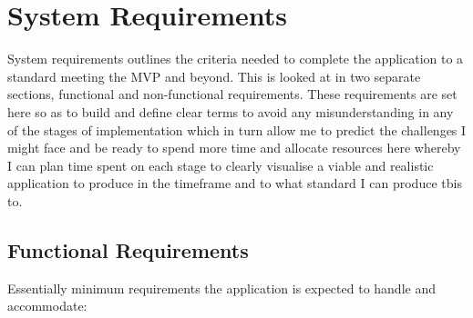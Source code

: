 \documentclass{report}
\begin{document}
	\section{System Requirements}
	System requirements outlines the criteria needed to complete the application to a standard meeting the MVP and beyond. This is looked at in two separate sections, functional and non-functional requirements. These requirements are set here so as to build and define clear terms to avoid any misunderstanding in any of the stages of implementation which in turn allow me to predict the challenges I might face and be ready to spend more time and allocate resources here whereby I can plan time spent on each stage to clearly visualise a viable and realistic application to produce in the timeframe and to what standard I can produce tbis to.
		\subsection{Functional Requirements}
		Essentially minimum requirements the application is expected to handle and accommodate:
\end{document}
